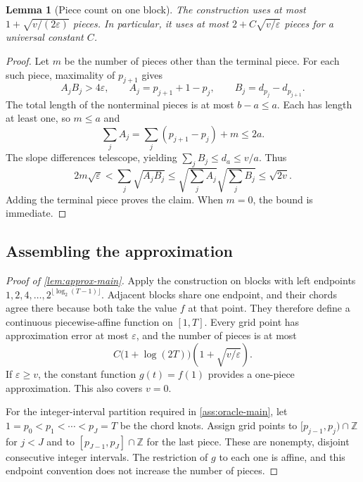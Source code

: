 \documentclass[11pt]{article}
\newtheorem{lemma}[lemma]{Lemma}
\theoremstyle{remark}
\begin{document}
\begin{samepage}
\begin{lemma}[Piece count on one block]\label{lem:block-count-app}
The construction uses at most $1+\sqrt{v/(2\varepsilon)}$ pieces.
In particular, it uses at most $2+C\sqrt{v/\varepsilon}$ pieces for a
universal constant $C$.
\end{lemma}
\end{samepage}

\begin{proof}
Let $m$ be the number of pieces other than the terminal piece.
For each such piece, maximality of $p_{j+1}$ gives
\[
A_jB_j>4\varepsilon,\qquad
A_j=p_{j+1}+1-p_j,\qquad B_j=d_{p_j}-d_{p_{j+1}}.
\]
The total length of the nonterminal pieces is at most $b-a\le a$.
Each has length at least one, so $m\le a$ and
\[
\sum_j A_j=\sum_j(p_{j+1}-p_j)+m\le2a.
\]
The slope differences telescope, yielding
$\sum_jB_j\le d_a\le v/a$.  Thus
\[
2m\sqrt{\varepsilon}
<\sum_j\sqrt{A_jB_j}
\le\sqrt{\sum_jA_j}\sqrt{\sum_jB_j}
\le\sqrt{2v}.
\]
Adding the terminal piece proves the claim.  When $m=0$, the bound is
immediate.
\end{proof}

\subsection{Assembling the approximation}

\begin{proof}[Proof of \cref{lem:approx-main}]
Apply the construction on blocks with left endpoints
$1,2,4,\ldots,2^{\lfloor\log_2(T-1)\rfloor}$.  Adjacent blocks share
one endpoint, and their chords agree there because both take the value
$f$ at that point.  They therefore define a continuous piecewise-affine
function on $[1,T]$.  Every grid point has approximation error at most
$\varepsilon$, and the number of pieces is at most
\[
C\bigl(1+\log(2T)\bigr)\left(1+\sqrt{v/\varepsilon}\right).
\]
If $\varepsilon\ge v$, the constant function $g(t)=f(1)$ provides a
one-piece approximation.  This also covers $v=0$.

For the integer-interval partition required in \cref{ass:oracle-main},
let $1=p_0<p_1<\cdots<p_J=T$ be the chord knots.  Assign grid points to
$[p_{j-1},p_j)\cap\mathbb Z$ for $j<J$ and to
$[p_{J-1},p_J]\cap\mathbb Z$ for the last piece.  These are nonempty,
disjoint consecutive integer intervals.  The restriction of $g$ to each
one is affine, and this endpoint convention does not increase the number
of pieces.
\end{proof}
\end{document}
